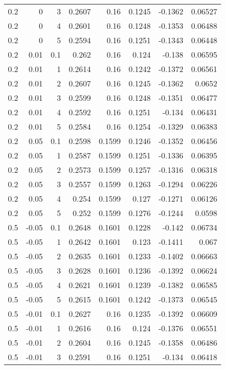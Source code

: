\documentclass{amsart}
\theoremstyle{plain}
\numberwithin{equation}{section}
\begin{document}
\begin{longtable}{r | r | r | r | r | r | r | r}
0.2 & 0 & 3 & 0.2607 & 0.16 & 0.1245 & -0.1362 & 0.06527 \\
0.2 & 0 & 4 & 0.2601 & 0.16 & 0.1248 & -0.1353 & 0.06488 \\
0.2 & 0 & 5 & 0.2594 & 0.16 & 0.1251 & -0.1343 & 0.06448 \\ \hline
0.2 & 0.01 & 0.1 & 0.262 & 0.16 & 0.124 & -0.138 & 0.06595 \\
0.2 & 0.01 & 1 & 0.2614 & 0.16 & 0.1242 & -0.1372 & 0.06561 \\
0.2 & 0.01 & 2 & 0.2607 & 0.16 & 0.1245 & -0.1362 & 0.0652 \\
0.2 & 0.01 & 3 & 0.2599 & 0.16 & 0.1248 & -0.1351 & 0.06477 \\
0.2 & 0.01 & 4 & 0.2592 & 0.16 & 0.1251 & -0.134 & 0.06431 \\
0.2 & 0.01 & 5 & 0.2584 & 0.16 & 0.1254 & -0.1329 & 0.06383 \\ \hline
0.2 & 0.05 & 0.1 & 0.2598 & 0.1599 & 0.1246 & -0.1352 & 0.06456 \\
0.2 & 0.05 & 1 & 0.2587 & 0.1599 & 0.1251 & -0.1336 & 0.06395 \\
0.2 & 0.05 & 2 & 0.2573 & 0.1599 & 0.1257 & -0.1316 & 0.06318 \\
0.2 & 0.05 & 3 & 0.2557 & 0.1599 & 0.1263 & -0.1294 & 0.06226 \\
0.2 & 0.05 & 4 & 0.254 & 0.1599 & 0.127 & -0.1271 & 0.06126 \\
0.2 & 0.05 & 5 & 0.252 & 0.1599 & 0.1276 & -0.1244 & 0.0598 \\ \hline
0.5 & -0.05 & 0.1 & 0.2648 & 0.1601 & 0.1228 & -0.142 & 0.06734 \\
0.5 & -0.05 & 1 & 0.2642 & 0.1601 & 0.123 & -0.1411 & 0.067 \\
0.5 & -0.05 & 2 & 0.2635 & 0.1601 & 0.1233 & -0.1402 & 0.06663 \\
0.5 & -0.05 & 3 & 0.2628 & 0.1601 & 0.1236 & -0.1392 & 0.06624 \\
0.5 & -0.05 & 4 & 0.2621 & 0.1601 & 0.1239 & -0.1382 & 0.06585 \\
0.5 & -0.05 & 5 & 0.2615 & 0.1601 & 0.1242 & -0.1373 & 0.06545 \\ \hline
0.5 & -0.01 & 0.1 & 0.2627 & 0.16 & 0.1235 & -0.1392 & 0.06609 \\
0.5 & -0.01 & 1 & 0.2616 & 0.16 & 0.124 & -0.1376 & 0.06551 \\
0.5 & -0.01 & 2 & 0.2604 & 0.16 & 0.1245 & -0.1358 & 0.06486 \\
0.5 & -0.01 & 3 & 0.2591 & 0.16 & 0.1251 & -0.134 & 0.06418 \\

\end{longtable}
\end{document}
